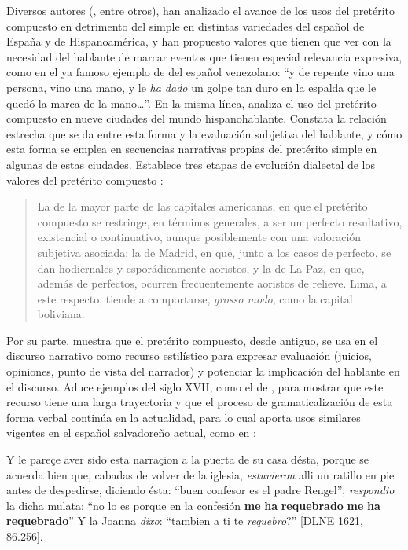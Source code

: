 \documentclass[output=paper]{../langscibook}
\begin{document}
Diversos autores (\citealt{BentivoglioSedano1992,CriadodeVal1948,DeJong1999,GarcíaNegroni1999,GutiérrezAraus2001,Hernández2006,Hernández2013,Howe2018,LopeBlanch1972,JaraYupanqui2009,Martínez-Atienza2008,TorresCacoullosHernández1999,SerranoMontesinos1994}, entre otros), han analizado el avance de los usos del pretérito compuesto en detrimento del simple en distintas variedades del español de España y de Hispanoamérica, y han propuesto valores que tienen que ver con la necesidad del hablante de marcar eventos que tienen especial relevancia expresiva, como en el ya famoso ejemplo de \citet[790--791]{BentivoglioSedano1992} del español venezolano: “y de repente vino una persona, vino una mano, y le \textit{ha dado} un golpe tan duro en la espalda que le quedó la marca de la mano…”.  En la misma línea, \citet{Soto2014} analiza el uso del pretérito compuesto en nueve ciudades del mundo hispanohablante. Constata la relación estrecha que se da entre esta forma y la evaluación subjetiva del hablante, y cómo esta forma se emplea en secuencias narrativas propias del pretérito simple en algunas de estas ciudades. Establece tres etapas de evolución dialectal de los valores del pretérito compuesto \citep[144]{Soto2014}:

\begin{quote}
La de la mayor parte de las capitales americanas, en que el pretérito compuesto se restringe, en términos generales, a ser un perfecto resultativo, existencial o continuativo, aunque posiblemente con una valoración subjetiva asociada; la de Madrid, en que, junto a los casos de perfecto, se dan hodiernales y esporádicamente aoristos, y la de La Paz, en que, además de perfectos, ocurren frecuentemente aoristos de relieve. Lima, a este respecto, tiende a comportarse, \textit{grosso modo}, como la capital boliviana. 
\end{quote}

Por su parte, \citet[276--277]{Hernández2013} muestra que el pretérito compuesto, desde antiguo, se usa en el discurso narrativo como recurso estilístico para expresar evaluación (juicios, opiniones, punto de vista del narrador) y potenciar la implicación del hablante en el discurso. Aduce ejemplos del siglo XVII, como el de , para mostrar que este recurso tiene una larga trayectoria y que el proceso de gramaticalización de esta forma verbal continúa en la actualidad, para lo cual aporta usos similares vigentes en el español salvadoreño actual, como en :

\ea\label{ex:palacios:1}
 Y le pareçe aver sido esta narraçion a la puerta de su casa désta, porque se acuerda bien que, cabadas de volver de la iglesia, \textit{estuvieron} alli un ratillo en pie antes de despedirse, diciendo ésta: “buen confesor es el padre Rengel”, \textit{respondio} la dicha mulata: “no lo es porque en la confesión \textbf{me} \textbf{ha} \textbf{requebrado} \textbf{me} \textbf{ha} \textbf{requebrado}” Y la Joanna \textit{dixo}: “tambien a ti te \textit{requebro}?” [DLNE 1621, 86.256].
\z
\end{document}
